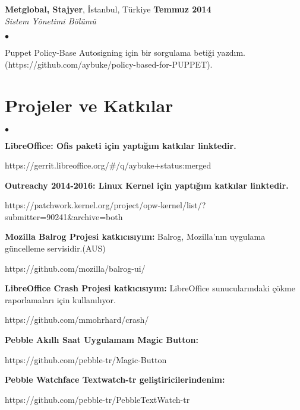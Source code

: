 \documentclass[margin,line]{res}
\newenvironment{list2}{
  \begin{list}{$\bullet$}{%
      \setlength{\itemsep}{0in}
      \setlength{\parsep}{0in} \setlength{\parskip}{0in}
      \setlength{\topsep}{0in} \setlength{\partopsep}{0in}
      \setlength{\leftmargin}{0.1in}}}{\end{list}}
\begin{document}
\begin{resume}
{\bf Metglobal, Stajyer}, \.{I}stanbul, T\"{u}rkiye \hfill {\bf Temmuz 2014}\\

\vspace{-.7cm}
{\em Sistem Y\"{o}netimi B\"{o}l\"{u}m\"{u} }
\vspace*{+.05in}
\begin{list2}
\item Puppet Policy-Base Autosigning i\c{c}in bir sorgulama beti\u{g}i yazd{\i}m. (https://github.com/aybuke/policy-based-for-PUPPET).
\end{list2}

\section{\sc Projeler ve Katk{\i}lar}
\begin{list2}
\item {\bf LibreOffice: Ofis paketi i\c{c}in yapt{\i}\u{g}{\i}m katk{\i}lar linktedir.}

https://gerrit.libreoffice.org/\#/q/aybuke+status:merged
\item {\bf Outreachy 2014-2016: Linux Kernel i\c{c}in yapt{\i}\u{g}{\i}m katk{\i}lar linktedir.}

https://patchwork.kernel.org/project/opw-kernel/list/?submitter=90241\&archive=both
\item {\bf Mozilla Balrog Projesi katk{\i}c{\i}s{\i}y{\i}m:} Balrog, Mozilla'n{\i}n uygulama g\"{u}ncelleme servisidir.(AUS)

https://github.com/mozilla/balrog-ui/
\item {\bf LibreOffice Crash Projesi katk{\i}c{\i}s{\i}y{\i}m:}  LibreOffice sunucular{\i}ndaki \c{c}\"{o}kme raporlamalar{\i} i\c{c}in kullan{\i}l{\i}yor.

https://github.com/mmohrhard/crash/
\item {\bf Pebble Ak{\i}ll{\i} Saat Uygulamam Magic Button:}

https://github.com/pebble-tr/Magic-Button
\item {\bf Pebble Watchface Textwatch-tr geli\c{s}tiricilerindenim:}

https://github.com/pebble-tr/PebbleTextWatch-tr
\end{list2}
\vspace{-.3cm}


\end{resume}
\end{document}
